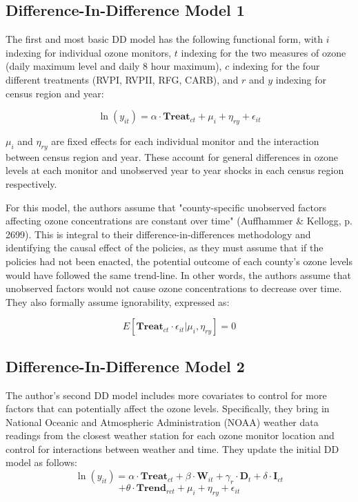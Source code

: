 \documentclass{article}
\begin{document}
\subsection{Difference-In-Difference Model 1}
The first and most basic DD model has the following functional form, with $i$ indexing for individual ozone monitors, $t$ indexing for the two measures of ozone (daily maximum level and daily 8 hour maximum), $c$ indexing for the four different treatments (RVPI, RVPII, RFG, CARB), and $r$ and $y$ indexing for census region and year: 

$$\ln{(y_{it})} = \alpha \cdot \textbf{Treat}_{ct} + \mu_i + \eta_{ry} + \epsilon_{it}$$ 

$\mu_i$ and $\eta_{ry}$ are fixed effects for each individual monitor and the interaction between census region and year. These account for general differences in ozone levels at each monitor and unobserved year to year shocks in each census region respectively. 

For this model, the authors assume that "county-specific unobserved factors affecting ozone concentrations are constant over time" (Auffhammer \& Kellogg, p.  2699). This is integral to their difference-in-differences methodology and identifying the causal effect of the policies, as they must assume that if the policies had not been enacted, the potential outcome of each county's ozone levels would have followed the same trend-line. In other words, the authors assume that unobserved factors would not cause ozone concentrations to decrease over time. They also formally assume ignorability, expressed as: 

$$E[\textbf{Treat}_{ct} \cdot \epsilon_{it} | \mu_i , \eta_{ry}] = 0$$ 


\subsection{Difference-In-Difference Model 2}

The author's second DD model includes more covariates to control for more factors that can potentially affect the ozone levels. Specifically, they bring in National Oceanic and Atmospheric Administration (NOAA) weather data readings from the closest weather station for each ozone monitor location and control for interactions between weather and time. They update the initial DD model as follows: 
$$\ln{(y_{it})} = \alpha \cdot \textbf{Treat}_{ct} + \beta \cdot \textbf{W}_{it} + \gamma_r \cdot \textbf{D}_t + \delta \cdot \textbf{I}_{ct} $$
$$+  \theta \cdot \textbf{Trend}_{rct} + \mu_i + \eta_{ry} + \epsilon_{it}$$
\end{document}
